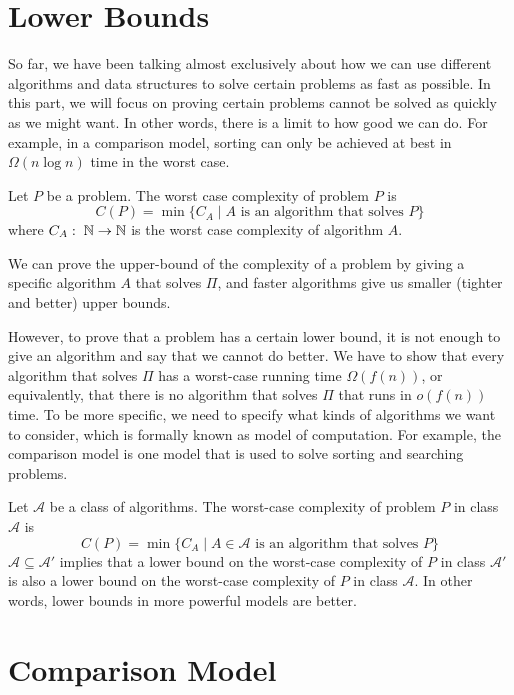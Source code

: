 \section{Lower Bounds}   

So far, we have been talking almost exclusively about how we can use different algorithms and data structures to solve certain problems as fast as possible. In this part, we will focus on proving certain problems cannot be solved as quickly as we might want. In other words, there is a limit to how good we can do. For example, in a comparison model, sorting can only be achieved at best in $\Omega(n \log n)$ time in the worst case.

\begin{definition}
    Let $P$ be a problem. The worst case complexity of problem $P$ is
    $$
    C(P) = \min \{ C_A \mid \text{$A$ is an algorithm that solves $P$} \}
    $$
    where $C_A:\; \mathbb{N} \to \mathbb{N}$ is the worst case complexity of algorithm $A$.
\end{definition}

We can prove the upper-bound of the complexity of a problem by giving a specific algorithm $A$ that solves $\Pi$, and faster algorithms give us smaller (tighter and better) upper bounds.

However, to prove that a problem has a certain lower bound, it is not enough to give an algorithm and say that we cannot do better. We have to show that every algorithm that solves $\Pi$ has a worst-case running time $\Omega(f(n))$, or equivalently, that there is no algorithm that solves $\Pi$ that runs in $o(f(n))$ time. To be more specific, we need to specify what kinds of algorithms we want to consider, which is formally known as model of computation. For example, the comparison model is one model that is used to solve sorting and searching problems.


Let $\mathcal{A}$ be a class of algorithms. The worst-case complexity of problem $P$ in class $\mathcal{A}$ is
$$
C(P) = \min \{ C_A \mid \text{$A \in \mathcal{A}$ is an algorithm that solves $P$} \}
$$
$\mathcal{A} \subseteq \mathcal{A}'$ implies that a lower bound on the worst-case complexity of $P$ in class $\mathcal{A}'$ is also a lower bound on the worst-case complexity of $P$ in class $\mathcal{A}$. In other words, lower bounds in more powerful models are better.

\section{Comparison Model}

